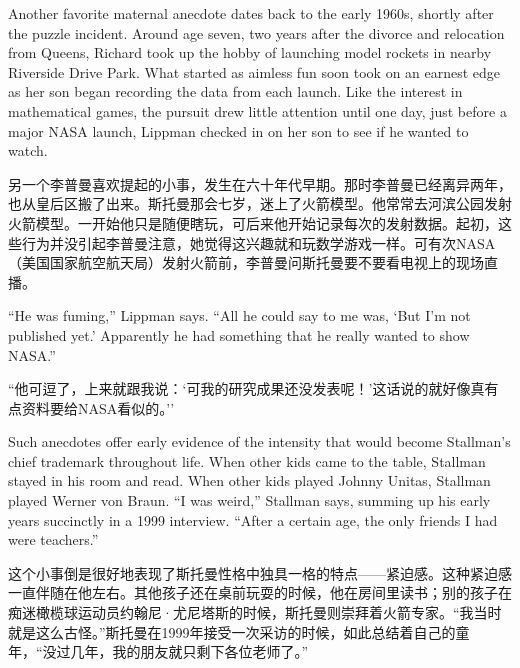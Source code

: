 \ifdefined\eng
Another favorite maternal anecdote dates back to the early 1960s, shortly after the puzzle incident. Around age seven, two years after the divorce and relocation from Queens, Richard took up the hobby of launching model rockets in nearby Riverside Drive Park. What started as aimless fun soon took on an earnest edge as her son began recording the data from each launch. Like the interest in mathematical games, the pursuit drew little attention until one day, just before a major NASA launch, Lippman checked in on her son to see if he wanted to watch.
\fi

\ifdefined\chs
另一个李普曼喜欢提起的小事，发生在六十年代早期。那时李普曼已经离异两年，也从皇后区搬了出来。斯托曼那会七岁，迷上了火箭模型。他常常去河滨公园发射火箭模型。一开始他只是随便瞎玩，可后来他开始记录每次的发射数据。起初，这些行为并没引起李普曼注意，她觉得这兴趣就和玩数学游戏一样。可有次NASA（美国国家航空航天局）发射火箭前，李普曼问斯托曼要不要看电视上的现场直播。
\fi

\ifdefined\eng
``He was fuming,'' Lippman says. ``All he could say to me was, `But I'm not published yet.' Apparently he had something that he really wanted to show NASA.''
\fi

\ifdefined\chs
``他可逗了，上来就跟我说：`可我的研究成果还没发表呢！'这话说的就好像真有点资料要给NASA看似的。''
\fi

\ifdefined\eng
Such anecdotes offer early evidence of the intensity that would become Stallman's chief trademark throughout life. When other kids came to the table, Stallman stayed in his room and read. When other kids played Johnny Unitas, Stallman played Werner von Braun. ``I was weird,'' Stallman says, summing up his early years succinctly in a 1999 interview. ``After a certain age, the only friends I had were teachers.''%
\fi

\ifdefined\chs
这个小事倒是很好地表现了斯托曼性格中独具一格的特点——紧迫感。这种紧迫感一直伴随在他左右。其他孩子还在桌前玩耍的时候，他在房间里读书；别的孩子在痴迷橄榄球运动员约翰尼·尤尼塔斯的时候，斯托曼则崇拜着火箭专家。``我当时就是这么古怪。''斯托曼在1999年接受一次采访的时候，如此总结着自己的童年，``没过几年，我的朋友就只剩下各位老师了。'' %
\fi

